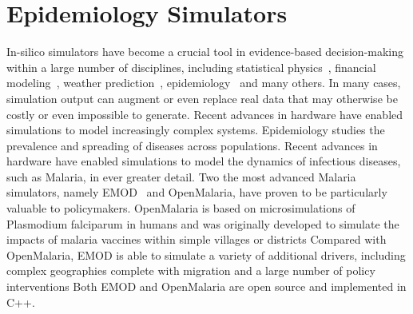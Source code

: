 \documentclass{article}
\begin{document}
 \section{Epidemiology Simulators}
 \label{sec:background}


In-silico simulators have become a crucial tool in evidence-based decision-making within a large number of disciplines, including statistical physics~\cite{landau_binder_2014}, financial modeling~\cite{jackel2002monte},
weather prediction~\cite{evensen1994sequential}, epidemiology~\cite{smith2008towards} and many others.
In many cases, simulation output can augment or even replace real data that may otherwise be costly or even impossible to generate.
Recent advances in hardware have enabled simulations to model increasingly complex systems.
Epidemiology studies the prevalence and spreading of diseases across populations. Recent advances in hardware have enabled simulations to model the dynamics of infectious diseases, such as Malaria, in ever greater detail.
Two the most advanced Malaria simulators, namely EMOD~\cite{bershteyn2018implementation} and OpenMalaria\cite{smith2008towards}, have proven to be particularly valuable to policymakers.
OpenMalaria is based on microsimulations of Plasmodium falciparum in humans and was originally developed to simulate the impacts of malaria vaccines within simple villages or districts
Compared with OpenMalaria, EMOD is able to simulate a variety of additional drivers, including complex geographies complete with migration and a large number of policy interventions
Both EMOD and OpenMalaria are open source and implemented in C++.



\end{document}
